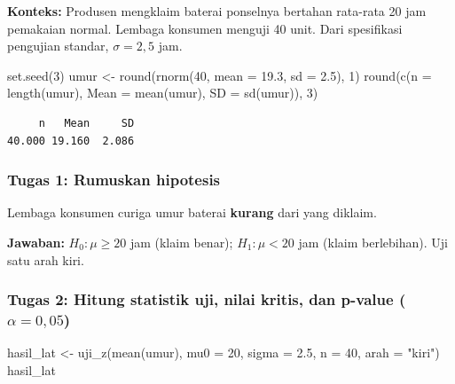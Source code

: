\documentclass[
  indonesian,
  letterpaper,
]{book}
\newenvironment{Shaded}{\begin{snugshade}}{\end{snugshade}}
\newcommand{\AttributeTok}[1]{\textcolor[rgb]{0.40,0.45,0.13}{#1}}
\newcommand{\DecValTok}[1]{\textcolor[rgb]{0.68,0.00,0.00}{#1}}
\newcommand{\FloatTok}[1]{\textcolor[rgb]{0.68,0.00,0.00}{#1}}
\newcommand{\FunctionTok}[1]{\textcolor[rgb]{0.28,0.35,0.67}{#1}}
\newcommand{\NormalTok}[1]{\textcolor[rgb]{0.00,0.23,0.31}{#1}}
\newcommand{\OtherTok}[1]{\textcolor[rgb]{0.00,0.23,0.31}{#1}}
\newcommand{\StringTok}[1]{\textcolor[rgb]{0.13,0.47,0.30}{#1}}
\begin{document}
\textbf{Konteks:} Produsen mengklaim baterai ponselnya bertahan
rata-rata 20 jam pemakaian normal. Lembaga konsumen menguji 40 unit.
Dari spesifikasi pengujian standar, \(\sigma = 2{,}5\) jam.

\begin{Shaded}
\begin{Highlighting}[]
\FunctionTok{set.seed}\NormalTok{(}\DecValTok{3}\NormalTok{)}
\NormalTok{umur }\OtherTok{\textless{}{-}} \FunctionTok{round}\NormalTok{(}\FunctionTok{rnorm}\NormalTok{(}\DecValTok{40}\NormalTok{, }\AttributeTok{mean =} \FloatTok{19.3}\NormalTok{, }\AttributeTok{sd =} \FloatTok{2.5}\NormalTok{), }\DecValTok{1}\NormalTok{)}
\FunctionTok{round}\NormalTok{(}\FunctionTok{c}\NormalTok{(}\AttributeTok{n =} \FunctionTok{length}\NormalTok{(umur), }\AttributeTok{Mean =} \FunctionTok{mean}\NormalTok{(umur), }\AttributeTok{SD =} \FunctionTok{sd}\NormalTok{(umur)), }\DecValTok{3}\NormalTok{)}
\end{Highlighting}
\end{Shaded}

\begin{verbatim}
     n   Mean     SD 
40.000 19.160  2.086 
\end{verbatim}

\subsubsection{Tugas 1: Rumuskan
hipotesis}\label{tugas-1-rumuskan-hipotesis}

Lembaga konsumen curiga umur baterai \textbf{kurang} dari yang diklaim.

\textbf{Jawaban:} \(H_0: \mu \geq 20\) jam (klaim benar);
\(H_1: \mu < 20\) jam (klaim berlebihan). Uji satu arah kiri.

\subsubsection{\texorpdfstring{Tugas 2: Hitung statistik uji, nilai
kritis, dan p-value
(\(\alpha = 0{,}05\))}{Tugas 2: Hitung statistik uji, nilai kritis, dan p-value (\textbackslash alpha = 0\{,\}05)}}\label{tugas-2-hitung-statistik-uji-nilai-kritis-dan-p-value-alpha-005}

\begin{Shaded}
\begin{Highlighting}[]
\NormalTok{hasil\_lat }\OtherTok{\textless{}{-}} \FunctionTok{uji\_z}\NormalTok{(}\FunctionTok{mean}\NormalTok{(umur), }\AttributeTok{mu0 =} \DecValTok{20}\NormalTok{, }\AttributeTok{sigma =} \FloatTok{2.5}\NormalTok{, }\AttributeTok{n =} \DecValTok{40}\NormalTok{, }\AttributeTok{arah =} \StringTok{"kiri"}\NormalTok{)}
\NormalTok{hasil\_lat}
\end{Highlighting}
\end{Shaded}
\end{document}
